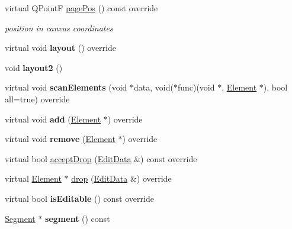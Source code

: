 \begin{DoxyCompactItemize}
virtual Q\+PointF \hyperlink{class_ms_1_1_bar_line_ab5d9ab51d253ccfcc5b393ce58fff42b}{page\+Pos} () const override
\begin{DoxyCompactList}\small\item\em position in canvas coordinates \end{DoxyCompactList}\item 
\mbox{\label{class_ms_1_1_bar_line_a42d506ca189702e276733a14b70f017e}} 
virtual void {\bfseries layout} () override
\item 
\mbox{\label{class_ms_1_1_bar_line_af2ff4c6050663a2dec87fdab9d5c5708}} 
void {\bfseries layout2} ()
\item 
\mbox{\label{class_ms_1_1_bar_line_afb9731fd5842bac6e08a7ea075dbd9ae}} 
virtual void {\bfseries scan\+Elements} (void $\ast$data, void($\ast$func)(void $\ast$, \hyperlink{class_ms_1_1_element}{Element} $\ast$), bool all=true) override
\item 
\mbox{\label{class_ms_1_1_bar_line_ad970f2ab88641b41f7c8681fa7fb3685}} 
virtual void {\bfseries add} (\hyperlink{class_ms_1_1_element}{Element} $\ast$) override
\item 
\mbox{\label{class_ms_1_1_bar_line_acd81ddc0ecbf4f775913aad54fe5cb5c}} 
virtual void {\bfseries remove} (\hyperlink{class_ms_1_1_element}{Element} $\ast$) override
\item 
virtual bool \hyperlink{class_ms_1_1_bar_line_a28c7d6fe82e930ac1015e4a0f74d7cca}{accept\+Drop} (\hyperlink{class_ms_1_1_edit_data}{Edit\+Data} \&) const override
\item 
virtual \hyperlink{class_ms_1_1_element}{Element} $\ast$ \hyperlink{class_ms_1_1_bar_line_af03756bb0cd6b98d703bcdaa1c161876}{drop} (\hyperlink{class_ms_1_1_edit_data}{Edit\+Data} \&) override
\item 
\mbox{\label{class_ms_1_1_bar_line_aaa4c66b973d6a63725278d290045ff14}} 
virtual bool {\bfseries is\+Editable} () const override
\item 
\mbox{\label{class_ms_1_1_bar_line_a8e0f50ebcd9993b640c0c3a1e9720ec4}} 
\hyperlink{class_ms_1_1_segment}{Segment} $\ast$ {\bfseries segment} () const

\end{DoxyCompactItemize}
